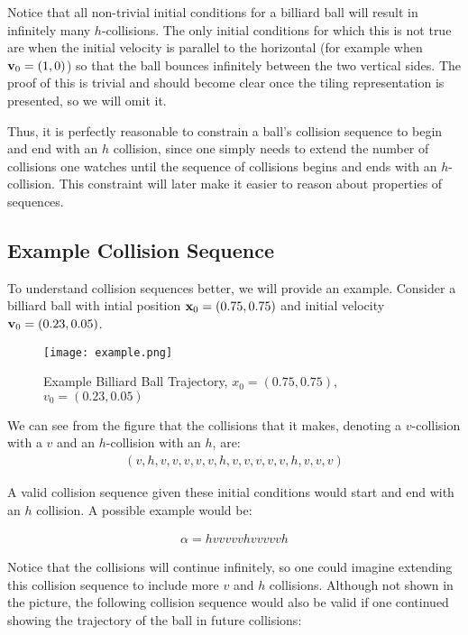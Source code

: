 Notice that all non-trivial initial conditions for a billiard ball will result in infinitely many $h$-collisions. The only initial conditions for which this is not true are when the initial velocity is parallel to the horizontal (for example when $\mathbf{v}_0 = (1, 0)$) so that the ball bounces infinitely between the two vertical sides. The proof of this is trivial and should become clear once the tiling representation is presented, so we will omit it.

Thus, it is perfectly reasonable to constrain a ball's collision sequence to begin and end with an $h$ collision, since one simply needs to extend the number of collisions one watches until the sequence of collisions begins and ends with an $h$-collision. This constraint will later make it easier to reason about properties of sequences.

\subsection{Example Collision Sequence}

To understand collision sequences better, we will provide an example. Consider a billiard ball with intial position $\mathbf{x}_0 = (0.75, 0.75)$ and initial velocity $\mathbf{v}_0 = (0.23, 0.05)$.

\begin{figure}
  \texttt{[image: example.png]}
  \caption{\label{fig:example}Example Billiard Ball Trajectory, $x_0 = (0.75, 0.75)$, $v_0 = (0.23, 0.05)$}
\end{figure}

We can see from the figure that the collisions that it makes, denoting a $v$-collision with a $v$ and an $h$-collision with an $h$, are:
\begin{eqnarray}
(v, h, v, v, v, v, v, h, v, v, v, v, v, h, v, v, v)
\end{eqnarray}

A valid collision sequence given these initial conditions would start and end with an $h$ collision. A possible example would be:

\begin{eqnarray}
  \alpha = hvvvvvhvvvvvh
\end{eqnarray}

Notice that the collisions will continue infinitely, so one could imagine extending this collision sequence to include more $v$ and $h$ collisions. Although not shown in the picture, the following collision sequence would also be valid if one continued showing the trajectory of the ball in future collisions:

